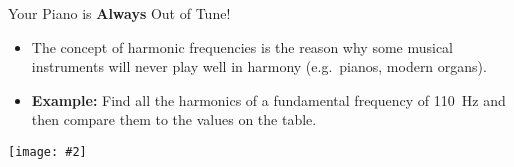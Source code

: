 \documentclass[12pt,aspectratio=169]{beamer}
\newcommand{\pic}[2]{\texttt{[image: \#2]}}
\begin{document}
\begin{frame}{Your Piano is \textbf{Always} Out of Tune!}
  \begin{itemize}
  \item The concept of harmonic frequencies is the reason why some musical
    instruments will never play well in harmony (e.g.\ pianos, modern organs).
  \item \textbf{Example:} Find all the harmonics of a fundamental frequency of
    \SI{110}{\hertz} and then compare them to the values on the table.
  \end{itemize}
  \begin{center}
    \pic{.6}{fundamental_freqs.png}
  \end{center}
\end{frame}
\end{document}
